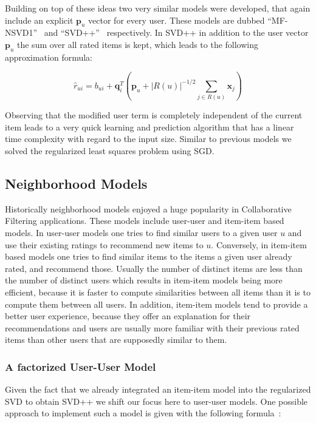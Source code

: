 \documentclass[10pt,conference,compsocconf]{IEEEtran}
\newcommand{\abs}[1]{\left\lvert#1\right\rvert}
\begin{document}
Building on top of these ideas two very similar models were developed, that
again include an explicit $\mathbf p_u$ vector for every user. These models are
dubbed ``MF-NSVD1''~\cite{takacs2008unified} and
``SVD++''~\cite{koren2008factorization, koren2011advances} respectively. In
SVD++ in addition to the user vector $\mathbf p_u$ the sum over all rated items
is kept, which leads to the following approximation formula:

\begin{equation}
  \hat{r}_{ui} = b_{ui} + \mathbf q_i^T \left( \mathbf p_u + \abs{R(u)}^{-1/2}
    \sum_{j \in R(u)} \mathbf x_j \right )
\end{equation}

Observing that the modified user term is completely independent of the current
item leads to a very quick learning and prediction algorithm that has a linear
time complexity with regard to the input size. Similar to previous models we
solved the regularized least squares problem using SGD.\@

\subsection{Neighborhood Models}
\label{sub:neighborhood_models}

Historically neighborhood models enjoyed a huge popularity in Collaborative
Filtering applications. These models include user-user and item-item based
models. In user-user models one tries to find similar users to a given user $u$
and use their existing ratings to recommend new items to $u$. Conversely, in
item-item based models one tries to find similar items to the items a given
user already rated, and recommend those. Usually the number of distinct items
are less than the number of distinct users which results in item-item models
being more efficient, because it is faster to compute similarities between all
items than it is to compute them between all users. In addition, item-item
models tend to provide a better user experience, because they offer an
explanation for their recommendations and users are usually more familiar with
their previous rated items than other users that are supposedly similar to them.

\subsubsection{A factorized User-User Model}
\label{ssub:a_factorized_user_user_model}

Given the fact that we already integrated an item-item model into the
regularized SVD to obtain SVD++ we shift our focus here to user-user models.
One possible approach to implement such a model is given with the following
formula~\cite{koren2010factor, koren2011advances}:
\end{document}
